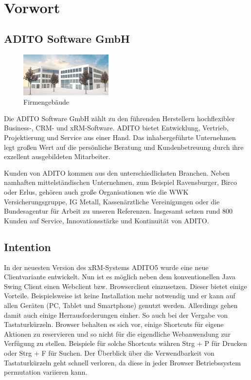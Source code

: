 \setcounter{page}{1}
\section{Vorwort}
\subsection{ADITO Software GmbH}
\begin{figure}
	\vspace{-8px}
	\centering
	\includegraphics[width=175px]{../img/Firmengebaeude}
	\caption{Firmengebäude}
\end{figure}

Die ADITO Software GmbH zählt zu den führenden Herstellern hochflexibler Business-, CRM- und xRM-Software. ADITO bietet Entwicklung, Vertrieb, Projektierung und Service aus einer Hand. Das inhabergeführte Unternehmen legt großen Wert auf die persönliche Beratung und Kundenbetreuung durch ihre exzellent ausgebildeten Mitarbeiter.

Kunden von ADITO kommen aus den unterschiedlichsten Branchen. Neben namhaften mittelständischen Unternehmen, zum Beispiel Ravensburger, Birco oder Erlus, gehören auch große Organisationen wie die WWK Versicherungsgruppe, IG Metall, Kassenärztliche Vereinigungen oder die Bundesagentur für Arbeit zu unseren Referenzen. Insgesamt setzen rund 800 Kunden auf Service, Innovationsstärke und Kontinuität von ADITO.

\subsection{Intention}
\par 
In der neuesten Version des xRM-Systems ADITO5 wurde eine neue Clientvariante entwickelt. Nun ist es möglich neben dem konventionellen Java Swing Client einen Webclient bzw. Browserclient einzusetzen. Dieser bietet einige Vorteile. Beispielsweise ist keine Installation mehr notwendig und er kann auf allen Geräten (PC, Tablet und Smartphone) genutzt werden. Allerdings gehen damit auch einige Herrausforderungen einher. So auch bei der Vergabe von Tastaturkürzeln. Browser behalten es sich vor, einige Shortcuts für eigene Aktionen zu reservieren und so nicht für die eigendliche Webanwendung zur Verfügung zu stellen. Beispiele für solche Shortcuts währen Strg + P für Drucken oder Strg + F für Suchen. Der Überblick über die Verwendbarkeit von Tastaturkürzeln geht schnell verloren, da diese in jeder Browser Betriebssystem permutation variieren kann.

